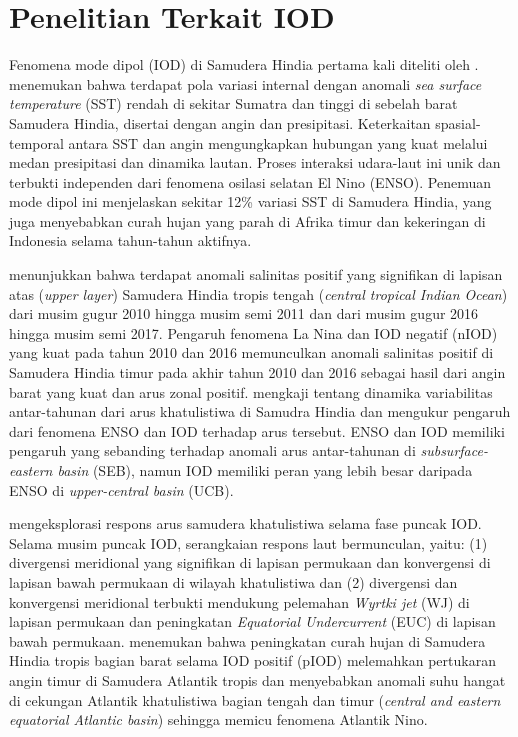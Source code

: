 \vspace{1.5pc}
\vspace{-1pc}
\section[Penelitian Terkait IOD]{Penelitian Terkait IOD}
\begin{spacing}{1.5}
	Fenomena mode dipol (IOD) di Samudera Hindia pertama kali diteliti oleh .  menemukan bahwa terdapat pola variasi internal dengan anomali \textit{sea surface temperature} (SST) rendah di sekitar Sumatra dan tinggi di sebelah barat Samudera Hindia, disertai dengan angin dan presipitasi. Keterkaitan spasial-temporal antara SST dan angin mengungkapkan hubungan yang kuat melalui medan presipitasi dan dinamika lautan. Proses interaksi udara-laut ini unik dan terbukti independen dari fenomena osilasi selatan El Nino (ENSO). Penemuan mode dipol ini menjelaskan sekitar 12\% variasi SST di Samudera Hindia, yang juga menyebabkan curah hujan yang parah di Afrika timur dan kekeringan di Indonesia selama tahun-tahun aktifnya.
	
	 menunjukkan bahwa terdapat anomali salinitas positif yang signifikan di lapisan atas (\textit{upper layer}) Samudera Hindia tropis tengah (\textit{central tropical Indian Ocean}) dari musim gugur 2010 hingga musim semi 2011 dan dari musim gugur 2016 hingga musim semi 2017. Pengaruh fenomena La Nina dan IOD negatif (nIOD) yang kuat pada tahun 2010 dan 2016 memunculkan anomali salinitas positif di Samudera Hindia timur pada akhir tahun 2010 dan 2016 sebagai hasil dari angin barat yang kuat dan arus zonal positif.  mengkaji tentang dinamika variabilitas antar-tahunan dari arus khatulistiwa di Samudra Hindia dan mengukur pengaruh dari fenomena ENSO dan IOD terhadap arus tersebut. ENSO dan IOD memiliki pengaruh yang sebanding terhadap anomali arus antar-tahunan di \textit{subsurface-eastern basin} (SEB), namun IOD memiliki peran yang lebih besar daripada ENSO di \textit{upper-central basin} (UCB). 
	
	 mengeksplorasi respons arus samudera khatulistiwa selama fase puncak IOD. Selama musim puncak IOD, serangkaian respons laut bermunculan, yaitu: (1) divergensi meridional yang signifikan di lapisan permukaan dan konvergensi di lapisan bawah permukaan di wilayah khatulistiwa dan (2) divergensi dan konvergensi meridional terbukti mendukung pelemahan \textit{Wyrtki jet} (WJ) di lapisan permukaan dan peningkatan \textit{Equatorial Undercurrent} (EUC) di lapisan bawah permukaan.  menemukan bahwa peningkatan curah hujan di Samudera Hindia tropis bagian barat selama IOD positif (pIOD) melemahkan pertukaran angin timur di Samudera Atlantik tropis dan menyebabkan anomali suhu hangat di cekungan Atlantik khatulistiwa bagian tengah dan timur (\textit{central and eastern equatorial Atlantic basin}) sehingga memicu fenomena Atlantik Nino.
	

\end{spacing}
